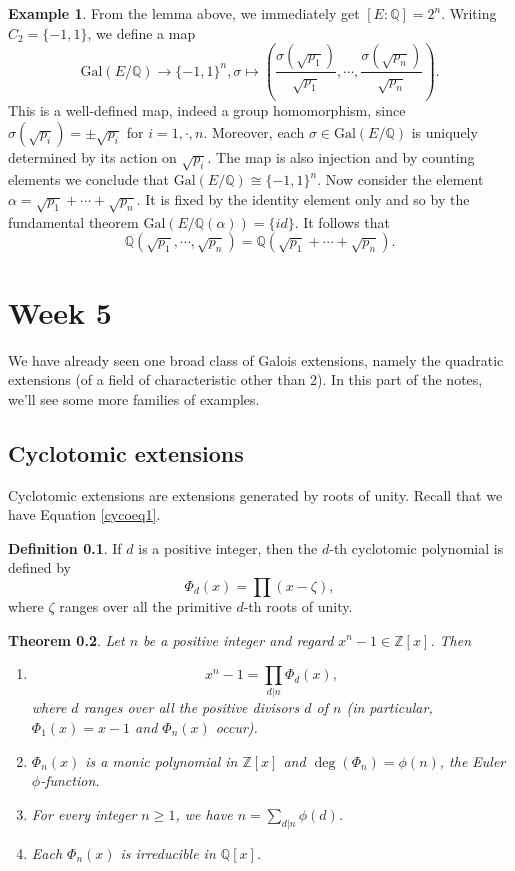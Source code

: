 \documentclass[12pt]{report}
\newtheorem{theorem}{Theorem}[section]
\theoremstyle{definition}
\newtheorem{definition}[theorem]{Definition}
\newtheorem{example}[theorem]{Example}
\newcommand{\Gal}{\text{Gal}}
\newcommand{\ZZ}{\mathbb{Z}}
\newcommand{\QQ}{\mathbb{Q}}
\begin{document}
\begin{example}
	From the lemma above, we immediately get $[E:\QQ]=2^n$. Writing $C_2=\{-1,1\}$, we define a map $$\Gal(E/\QQ) \to \{-1,1\}^n, \sigma \mapsto  (\frac{\sigma(\sqrt{p_1})}{\sqrt{p_1}},\cdots,\frac{\sigma(\sqrt{p_n})}{\sqrt{p_n}}).$$ This is a well-defined map, indeed a group homomorphism, since $\sigma(\sqrt{p_i})=\pm\sqrt{p_i}$ for $i=1,\cdot,n$. Moreover, each $\sigma\in \Gal(E/\QQ)$ is uniquely determined by its action on $\sqrt{p_i}$. The map is also injection and by counting elements we conclude that $\Gal(E/\QQ) \cong \{-1,1\}^n$. Now consider the element $\alpha=\sqrt{p_1}+\cdots+\sqrt{p_n}$. It is fixed by the identity element only and so by the fundamental theorem $\Gal(E/\QQ(\alpha))=\{id\}$. It follows that $$\QQ(\sqrt{p_1},\cdots,\sqrt{p_n})=\QQ(\sqrt{p_1}+\cdots+\sqrt{p_n}).$$
\end{example}

\chapter*{Week 5}
\setcounter{chapter}{5}

We have already seen one broad class of Galois extensions, namely the quadratic extensions (of a field of characteristic other than 2). In this part of the notes, we'll see some more families of examples.

\section{Cyclotomic extensions}
Cyclotomic extensions are extensions generated by roots of unity. Recall that we have Equation \ref{cycoeq1}.

\begin{definition}
	If $d$ is a positive integer, then the $d$-th cyclotomic polynomial is defined by $$\Phi_d(x) =\prod (x - \zeta),$$ where $\zeta$ ranges over all the primitive $d$-th roots of unity.
\end{definition}

\begin{theorem}
	Let $n$ be a positive integer and regard $x^n - 1 \in  \ZZ[x]$. Then
	\begin{enumerate}
		\item $$x^n-1 = \prod_{d|n} \Phi_d(x),$$ where $d$ ranges over all the positive divisors $d$ of $n$ (in particular, $\Phi_1(x) = x - 1$ and $\Phi_n(x)$ occur).
		\item $\Phi_n(x)$ is a monic polynomial in $\ZZ[x]$ and $\deg(\Phi_n) = \phi(n)$, the Euler $\phi$-function.
		\item For every integer $n\geq 1$, we have $n=\sum_{d|n} \phi(d)$.
		\item Each $\Phi_n(x)$ is irreducible in $\QQ[x]$.
	\end{enumerate}
\end{theorem}
\end{document}
